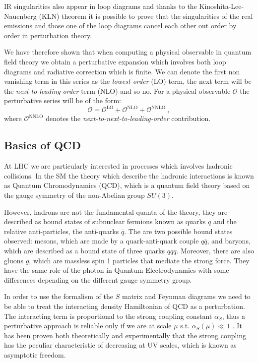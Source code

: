 \documentclass[../main/main.tex]{subfiles}
\begin{document}
IR singularities also appear in loop diagrams and thanks to the Kinoshita-Lee-Nauenberg (KLN) theorem it is possible to prove that the singularities of the real emissions and those one of the loop diagrams cancel each other out  order by order in perturbation theory.

We have therefore shown that when computing a physical observable in quantum field theory we obtain a perturbative expansion which 
involves both loop diagrams and radiative correction which is finite. We can denote the first non vanishing term in this series as the 
\emph{lowest order} (LO) term, the next term will be the \emph{next-to-leading-order} term (NLO) and so no.
For a physical observable $\mathcal{O}$ the perturbative series will be of the form:
\begin{equation}
	\mathcal{O} = \mathcal{O}^{\text{LO}}+\mathcal{O}^{\text{NLO}}+ \mathcal{O}^{\text{NNLO}} \ ,
\end{equation}
	where $ \mathcal{O}^{\text{NNLO}}$ denotes the \emph{next-to-next-to-leading-order }contribution.

\subsection{Basics of QCD}
At LHC we are particularly interested in processes which involves hadronic collisions. In the SM the theory which describe the hadronic interactions is known as Quantum 
Chromodynamics (QCD), which is a quantum field theory based on the gauge symmetry of the non-Abelian group $SU(3)$.

However, hadrons are not the fundamental quanta of the theory, they are described as bound states of subnuclear fermions known as quarks $q$ and the relative anti-particles, the anti-quarks $\bar{q}$. The 
are two possible bound states observed: mesons, which are made by a quark-anti-quark couple $q\bar{q}$, 
and baryons, which are described as a bound state of three quarks $qqq$. Moreover, there are also gluons $g$, which are massless spin 1 particles that mediate the strong force. They have the same role of the photon in Quantum Electrodynamics with some differences depending on the different gauge symmetry group.

In order to use the formalism of the $S$ matrix and Feynman diagrams we need to be able to treat the interacting density Hamiltonian of QCD as 
a perturbation. The interacting term is proportional to the strong coupling constant $\alpha_S$, thus a perturbative approach is reliable only 
if we are at scale $\mu $ s.t. $\alpha_S(\mu)  \ll 1$ . It has been proven both theoretically and experimentally that the strong coupling has the peculiar characteristic of decreasing at UV scales, which is known as asymptotic freedom.
\end{document}
